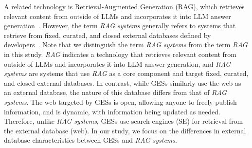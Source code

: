A related technology is Retrieval-Augmented Generation (RAG), which retrieves relevant content from outside of LLMs and incorporates it into LLM answer generation~\cite{internet-augmented-language-models-fewshot-arxiv22, internet-augmented-dialogue-generation-arxiv21, rag-kdd24}.
However, the term \emph{RAG systems} generally refers to systems that retrieve from fixed, curated, and closed external databases defined by developers~\cite{mirage-acl24, lála2023paperqa, almanac-nejmai-2024}.
Note that we distinguish the term \emph{RAG systems} from the term \emph{RAG} in this study. 
\emph{RAG} indicates a technology that retrieves relevant content from outside of LLMs and incorporates it into LLM answer generation, and \emph{RAG systems} are systems that use \emph{RAG} as a core component and target fixed, curated, and closed external databases.
In contrast, while GESs similarly use the web as an external database, the nature of this database differs from that of \emph{RAG systems}.
The web targeted by GESs is open, allowing anyone to freely publish information, and is dynamic, with information being updated as needed.
Therefore, unlike \emph{RAG systems}, GESs use search engines (SE) for retrieval from the external database (web).
In our study, we focus on the differences in external database characteristics between GESs and \emph{RAG systems}.
